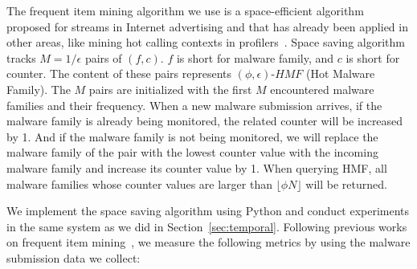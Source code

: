 The frequent item mining algorithm we use is a space-efficient algorithm~\cite{space-saving} 
proposed for streams in Internet advertising and that has already been applied in other areas, 
like mining hot calling contexts in profilers~\cite{hot-calling-context}.
Space saving algorithm tracks $M=1/\epsilon$ pairs of $(f, c)$. 
$f$ is short for malware family, and $c$ is short for counter.  
The content of these pairs represents $(\phi, \epsilon)\mbox{-}HMF$ (Hot Malware Family). 
The $M$ pairs are initialized with the first $M$ encountered malware families and their frequency. 
When a new malware submission arrives, 
if the malware family is already being monitored, 
the related counter will be increased by 1. 
And if the malware family is not being monitored, 
we will replace the malware family of the pair with the lowest counter value with the incoming malware family
and increase its counter value by 1. 
When querying HMF, 
all malware families whose counter values are larger than $\lfloor \phi N \rfloor$ will be returned. 


We implement the space saving algorithm using Python
and conduct experiments in the same system as we did in Section~\ref{sec:temporal}.
Following previous works on frequent item mining~\cite{hot-calling-context}, 
we measure the following metrics by using the malware submission data we collect:

